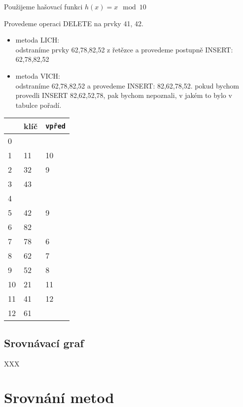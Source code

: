 \begin{priklad}
Použijeme hašovací funkci $h(x) = x \mod 10$

Provedeme operaci DELETE na prvky 41, 42.

\begin{itemize}
\item metoda LICH: \\
odstraníme prvky 62,78,82,52 z řetězce a provedeme postupně 
INSERT: 62,78,82,52

\item metoda VICH: \\
odstraníme 62,78,82,52 a provedeme INSERT: 82,62,78,52.
pokud bychom provedli INSERT 82,62,52,78, pak bychom nepoznali, v jakém to
bylo v tabulce pořadí.
\end{itemize}

\vspace{5mm}

\begin{tabular}{|l||l|l|}
\hline
 & klíč& {\tt vpřed} \\
\hline
0&	& \\
1&	11& 10\\
2&	32& 9\\
3&	43& \\
4&	& \\
5&	42& 9\\
6&	82& \\
7&	78& 6\\
8&	62& 7\\
9&	52& 8\\
\hline
10&	21& 11\\
11&	41& 12\\
12&	61& \\
\hline
\end{tabular}
\end{priklad}

\vspace{5mm}


\subsection{Srovnávací graf}

XXX


\section{Srovnání metod}

